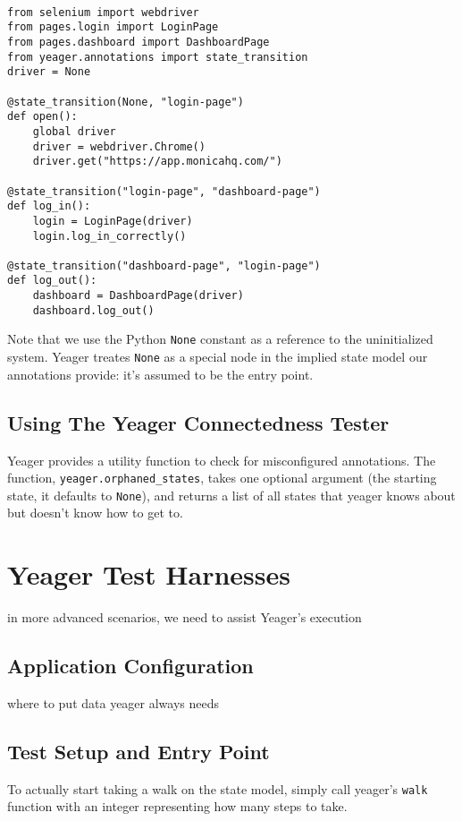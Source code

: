 {\tt
\begin{verbatim}
from selenium import webdriver
from pages.login import LoginPage
from pages.dashboard import DashboardPage
from yeager.annotations import state_transition
driver = None

@state_transition(None, "login-page")
def open():
    global driver
    driver = webdriver.Chrome()
    driver.get("https://app.monicahq.com/")

@state_transition("login-page", "dashboard-page")
def log_in():
    login = LoginPage(driver)
    login.log_in_correctly()

@state_transition("dashboard-page", "login-page")
def log_out():
    dashboard = DashboardPage(driver)
    dashboard.log_out()
\end{verbatim}
}

Note that we use the Python \texttt{None} constant as a reference to the uninitialized system. Yeager treates \texttt{None} as a special node in the implied state model our annotations provide: it's assumed to be the entry point.

\subsection{Using The Yeager Connectedness Tester}
Yeager provides a utility function to check for misconfigured annotations. The function, \texttt{yeager.orphaned\_states}, takes one optional argument (the starting state, it defaults to \texttt{None}), and returns a list of all states that yeager knows about but doesn't know how to get to.

\section{Yeager Test Harnesses}
in more advanced scenarios, we need to assist Yeager's execution %

\subsection{Application Configuration}
where to put data yeager always needs %

\subsection{Test Setup and Entry Point}
To actually start taking a walk on the state model, simply call yeager's \texttt{walk} function with an integer representing how many steps to take.

